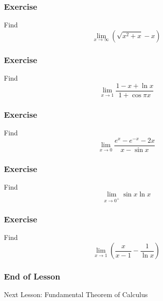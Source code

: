 \documentclass[xcolor=dvipsnames]{beamer}
\begin{document}
\begin{frame}
  \frametitle{Exercise}
  {\ubung} Find
  \begin{equation}
    \label{eq:eigahrai}
    \lim_{x\rightarrow\infty}(\sqrt{x^{2}+x}-x)
  \end{equation}
\end{frame}

\begin{frame}
  \frametitle{Exercise}
  {\ubung} Find
  \begin{equation}
    \label{eq:vuciecha}
    \lim_{x\rightarrow{}1}\frac{1-x+\ln{}x}{1+\cos\pi{}x}
  \end{equation}
\end{frame}

\begin{frame}
  \frametitle{Exercise}
  {\ubung} Find
  \begin{equation}
    \label{eq:taihahri}
    \lim_{x\rightarrow{}0}\frac{e^{x}-e^{-x}-2x}{x-\sin{}x}
  \end{equation}
\end{frame}

\begin{frame}
  \frametitle{Exercise}
  {\ubung} Find
  \begin{equation}
    \label{eq:eemeeyae}
    \lim_{x\rightarrow{}0^{+}}\sin{}x\ln{}x
  \end{equation}
\end{frame}

\begin{frame}
  \frametitle{Exercise}
  {\ubung} Find
  \begin{equation}
    \label{eq:gasuchoh}
    \lim_{x\rightarrow{}1}\left(\frac{x}{x-1}-\frac{1}{\ln{}x}\right)
  \end{equation}
\end{frame}

\begin{frame}
  \frametitle{End of Lesson}
Next Lesson: Fundamental Theorem of Calculus
\end{frame}
\end{document}

